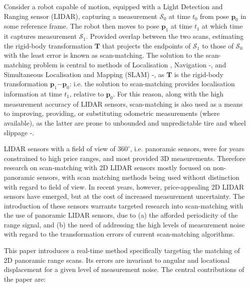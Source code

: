 Consider a robot capable of motion, equipped with a Light Detection and Ranging
sensor (LIDAR), capturing a measurement $\mathcal{S}_0$ at time $t_0$ from pose
$\bm{p}_0$ in some reference frame. The robot then moves to pose $\bm{p}_1$ at
time $t_1$ at which time it captures measurement $\mathcal{S}_1$. Provided
overlap between the two scans, estimating the rigid-body transformation
$\bm{T}$ that projects the endpoints of $\mathcal{S}_1$ to those of
$\mathcal{S}_0$ with the least error is known as scan-matching. The solution to
the scan-matching problem is central to methods of Localisation
\cite{lidar_localisation_1}\cite{lidar_localisation_2}, Navigation
\cite{lidar_navigation_1}-\cite{lidar_navigation_4}, and Simultaneous
Localisation and Mapping (SLAM) \cite{lidar_slam_1}-\cite{lidar_slam_5}, as
$\bm{T}$ is the rigid-body transformation $\bm{p}_1$$-$$\bm{p}_0$: i.e. the
solution to scan-matching provides localisation information at time $t_1$,
relative to $\bm{p}_0$. For this reason, along with the high measurement
accuracy of LIDAR sensors, scan-matching is also used as a means to
improving, providing, or substituting odometric measurements (where available),
as the latter are prone to unbounded and unpredictable tire and wheel
slippage \cite{olson}-\cite{lidar_odom_3}.

LIDAR sensors with a field of view of $360^\circ$, i.e. panoramic sensors, were
for years constrained to high price ranges, and most provided 3D measurements.
Therefore research on scan-matching with 2D LIDAR sensors mostly focused on
non-panoramic sensors, with scan matching methods being used without distinction
with regard to field of view. In recent years, however, price-appealing
2D LIDAR sensors have emerged, but at the cost of increased measurement
uncertainty. The introduction of these sensors warrants targeted research
into scan-matching with the use of panoramic LIDAR sensors, due to (a) the
afforded periodicity of the range signal, and (b) the need of
addressing the high levels of measurement noise with regard to the
transformation errors of current scan-matching algorithms.

This paper introduces a real-time method specifically targeting the matching of
2D panoramic range scans. Its errors are invariant to angular and locational
displacement for a given level of measurement noise.  The central contributions
of the paper are:

